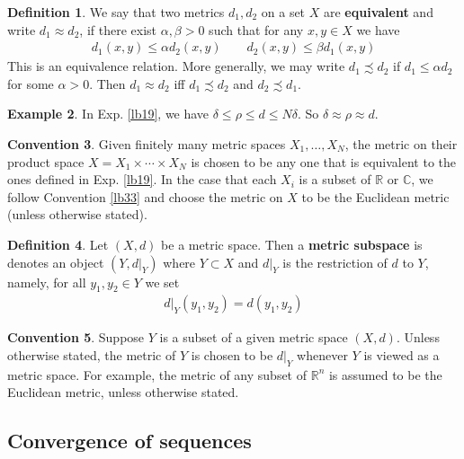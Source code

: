 \documentclass[12pt,b5paper,notitlepage]{article}
\theoremstyle{definition}
\newtheorem{df}{Definition}[section]
\newtheorem{eg}[df]{Example}
\newtheorem{cv}[df]{Convention}
\theoremstyle{plain}
\newcommand{\Cbb}{\mathbb C}
\newcommand{\Rbb}{\mathbb R}
\numberwithin{equation}{section}
\begin{document}
\begin{df}
We say that two metrics $d_1,d_2$ on a set $X$ are  \textbf{equivalent} and write $d_1\approx d_2$, if there exist $\alpha,\beta>0$ such that  for any $x,y\in X$ we have
\begin{gather*}
d_1(x,y)\leq\alpha d_2(x,y)\qquad d_2(x,y)\leq\beta d_1(x,y)
\end{gather*}  
This is an equivalence relation. More generally, we may write $d_1\precsim d_2$ if $d_1\leq \alpha d_2$ for some $\alpha>0$. Then $d_1\approx d_2$ iff $d_1\precsim d_2$ and $d_2\precsim d_1$.
\end{df}



\begin{eg}
In Exp. \ref{lb19}, we have $\delta\leq \rho\leq d\leq N\delta$. So $\delta\approx\rho\approx d$.
\end{eg}

\begin{cv}\label{lb32}
Given finitely many metric spaces $X_1,\dots,X_N$, the metric on their product space $X=X_1\times\cdots\times X_N$ is chosen to be any one that is equivalent to the ones defined in Exp. \ref{lb19}. In the case that each $X_i$ is a subset of $\Rbb$ or $\Cbb$, we follow Convention \ref{lb33} and choose the metric on $X$ to be the Euclidean metric (unless otherwise stated).
\end{cv}


\begin{df}\label{lb43}
Let $(X,d)$ be a metric space. Then a \textbf{metric subspace}  is denotes an object $(Y,d|_Y)$ where $Y\subset X$ and $d|_Y$ is the restriction of $d$ to $Y$, namely, for all $y_1,y_2\in Y$ we set
\begin{align*}
d|_Y(y_1,y_2)=d(y_1,y_2)
\end{align*}
\end{df}

\begin{cv}\label{lb76}
Suppose $Y$ is a subset of a given metric space $(X,d)$. Unless otherwise stated, the metric of $Y$ is chosen to be $d|_Y$ whenever $Y$ is viewed as a metric space. For example, the metric of any subset of $\Rbb^n$ is assumed to be the Euclidean metric, unless otherwise stated.
\end{cv}



\subsection{Convergence of sequences} \label{lb73}
\end{document}
